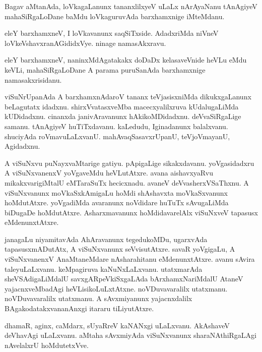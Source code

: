 \documentclass{article}
\begin{document}
\begin{mn}
Bagav
aMtanAda,  loVkagaLanunx  tananxlilxyeV  uLaLx  nArAyaNanu  tAnAgiyeV  
mahaSiRgaLoDane  baMdu  loVkaguruvAda  barxhamxnige  iMteMdanu. 
\end{mn}

\begin{mn}
eleY  barxhamxneV,  I  loVkavanunx saqSiTxside.  AdadxriMda  niVneV  
loVkeVshavxranAGididxVye.  ninage  namasAkxravu.
\end{mn}

\begin{mn}
eleY barxhamxneV,  naninxMdAgatakakx  doDaDx kelasaveVnide  heVLu  eMdu  
keVLi,  mahaSiRgaLoDane  A parama  puruSanAda  barxhamxnige  namasakxrisidanu.
\end{mn}

\begin{mn}
viSuNrUpanAda A barxhamxnAdaroV  tananx  teVjasisxniMda dikukxgaLanunx  beLagutatx  idadxnu.   
shirxVvatasxveMba  macecxyalilxruva  kUdalugaLiMda  kUDidadxnu.   cinanxda  janivAravanunx  
hAkikoMDidadxnu.  deVvaSiRgaLige  samanu.  tAnAgiyeV  huTiTxdavanu.  kaLedudu,  Iginadanunx  
balalxvanu. shuciyAda  roVmavuLaLxvanU.  mahAvaqSasavxrUpanU, teVjoVmayanU,  Agidadxnu. 
\end{mn}

\begin{mn}
A viSuNxvu  puNayxvaMtarige  gatiyu.  pApigaLige  sikakxdavanu.  yoVgasidadxru  A viSuNxvanenxV  
yoVgaveMdu  heVLutAtxre. avana  aishavxyaRvu  mikakxvarigiMtalU  eMTaraSuTx  hecicxnadu.  avaneV  
deVvasherxVSaThxnu.  A viSuNxvanunx  moVkaSxkAmigaLu  hoMdi  shAshavxta moVkaSxvanunx  hoMdutAtxre.  
yoVgadiMda  avaranunx  noVdidare  huTuTx  sAvugaLiMda  biDugaDe  hoMdutAtxre.  Asharxmavanunx  
hoMdidavarelAlx  viSuNxveV  tapasusx  eMdenunxtAtxre.
\end{mn}

\begin{mn}
janagaLu  niyamitavAda  AhAravanunx  tegedukoMDu,  ugarxvAda  tapasusxmADutAtx,  A viSuNxvanunx  
seVvisutAtxre.  savaR  yoVgigaLu,  A viSuNxvanenxV  AnaMtaneMdare  nAsharahitanu  eMdenunxtAtxre.  avanu sAvira  
taleyuLaLxvanu.  keMpagiruva  kaNuNxLaLxvanu.  utatxmarAda  sheVSAdigaLiMdalU  savxgARpeVkiSxgaLAda  
bArxhamxNariMdalU  AtaneV  yajacnxveMbadAgi  heVLisikoLuLxtAtxne.  noVDuvavaralilx utatxmanu.  noVDuvavaralilx  
utatxmanu.  A sAvxmiyanunx yajacnxdalilx   BAgakodatakxvananAnxgi itararu tiLiyutAtxre.
\end{mn}

\begin{mn}
dhamaR,  aginx,  caMdarx,  sUyaRreV  kaNANxgi  uLaLxvanu.  AkAshaveV  deVhavAgi  
uLaLxvanu.  aMtaha  sAvxmiyAda  viSuNxvanunx  sharaNAthiRgaLAgi  nAvelalxrU  hoMdutetxVve.
\end{mn}
\end{document}
